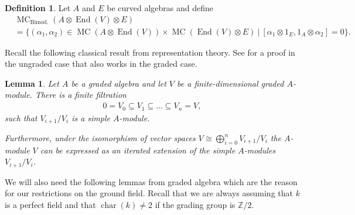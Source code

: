 \documentclass[a4paper]{amsart}
\theoremstyle{plain}
\newtheorem{lem}[thm]{Lemma}
\theoremstyle{definition}
\newtheorem{defn}[thm]{Definition}
\theoremstyle{remark}
\newcommand{\Z}{\mathbb{Z}}
\DeclareMathOperator{\End}{End}
\DeclareMathOperator{\MC}{MC}
\numberwithin{equation}{section}
\theoremstyle{plain}
\begin{document}
	\begin{defn}
		Let $A$ and $E$ be curved algebras and define
		\begin{align*}
			&\MC_\text{Bimod.}(A\otimes \End(V)\otimes E)\\
			&=\{(\alpha_1,\alpha_2)\in \MC(A\otimes \End(V))\times \MC(\End(V)\otimes E)\ |\ [\alpha_1\otimes 1_E,1_A\otimes \alpha_2]=0\}.
		\end{align*}
	\end{defn}
	Recall the following classical result from representation theory. See \cite[Lemma 3.4.2]{Etingof11} for a proof in the ungraded case that also works in the graded case.
	\begin{lem}\label{rep. lemma 1}
		Let $A$ be a graded algebra and let $V$ be a finite-dimensional graded $A$-module. There is a finite filtration
		\begin{align}
			0=V_0\subseteq V_1\subseteq ...\subseteq V_n=V,
		\end{align}
		such that $V_{i+1}/V_i$ is a simple $A$-module. 
		
		Furthermore, under the isomorphism of vector spaces $V\cong \bigoplus^n_{i=0} V_{i+1}/V_i$ the $A$-module $V$ can be expressed as an iterated extension of the simple $A$-modules $V_{i+1}/V_i$.
	\end{lem}
		We will also need the following lemmas from graded algebra which are the reason for our restrictions on the ground field. Recall that we are always assuming 	that $k$ is a perfect field and that $\operatorname{char}(k) \neq 2$ if the grading group is $\Z/2$.
		
\end{document}
